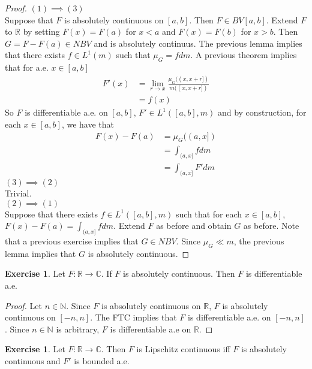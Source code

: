 \documentclass[12pt]{amsart}
\theoremstyle{definition}
\newtheorem{ex}[definition]{Exercise}
\newcommand{\C}{\mathbb{C}}
\newcommand{\N}{\mathbb{N}}
\newcommand{\R}{\mathbb{R}}
\begin{document}
	\begin{proof}
		$(1) \implies (3)$ \\
		Suppose that $F$ is absolutely continuous on $[a,b]$. Then $F \in BV[a,b]$. Extend $F$ to $\R$ by setting $F(x) = F(a)$ for $x<a$ and $F(x)=F(b)$ for $x>b$. Then $G=F-F(a) \in NBV$ and is absolutely continuus. The previous lemma implies that there exists $f \in L^1(m)$ such that $\mu_G = fdm$. A previous theorem implies that for a.e. $x \in [a,b]$
		\begin{align*}
			F'(x) 
			&= \lim_{r \rightarrow x} \frac{\mu_G((x,x+r])}{m((x,x+r])}\\
			&= f(x)
		\end{align*}  
		So $F$ is differentiable a.e. on $[a,b]$, $F' \in L^1([a,b], m)$ and by construction, for each $x \in [a,b]$, we have that
		\begin{align*}
			F(x)-F(a)
			&= \mu_G((a,x])\\
			&= \int_{(a,x]}fdm\\
			&= \int_{(a,x]}F'dm
		\end{align*}
		$(3) \implies (2)$\\
		Trivial.\\
		$(2) \implies (1)$\\
		Suppose that there exists $f \in L^1([a,b], m)$ such that for each $x \in [a,b]$, $F(x)-F(a)=\int_{(a,x]}fdm$. Extend $F$ as before and obtain $G$ as before. Note that a previous exercise implies that $G \in NBV$. Since $\mu_G \ll m$, the previous lemma implies that $G$ is absolutely continuous.
	\end{proof}
	
	\begin{ex}
		Let $F: \R \rightarrow \C$. If $F$ is absolutely continuous. Then $F$ is differentiable a.e.
	\end{ex}
	
	\begin{proof}
		Let $n \in \N$. Since $F$ is absolutely continuous on $\R$, $F$ is absolutely continuous on $[-n,n]$. The FTC implies that $F$ is differentiable a.e. on $[-n,n]$. Since $n \in \N$ is arbitrary, $F$ is differentiable a.e on $\R$.
	\end{proof}
	
	\begin{ex}
		Let $F: \R \rightarrow \C$. Then $F$ is Lipschitz continuous iff $F$ is absolutely continuous and $F'$ is bounded a.e.
	\end{ex}
	
\end{document}
